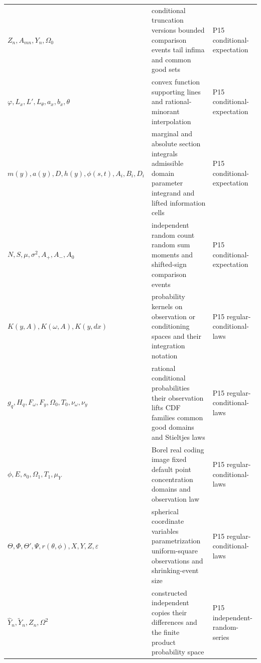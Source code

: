 \begin{longtable}{@{}p{}p{}p{}@{}}
\(Z_n,\allowbreak A_{mn},\allowbreak Y_n,\allowbreak \Omega_0\) & conditional truncation versions bounded comparison events tail infima and common good sets & P15 conditional-\allowbreak{}expectation \\
\(\varphi,\allowbreak L_x,\allowbreak L',\allowbreak L_\theta,\allowbreak a_x,\allowbreak b_x,\allowbreak \theta\) & convex function supporting lines and rational-minorant interpolation & P15 conditional-\allowbreak{}expectation \\
\(m(y),\allowbreak a(y),\allowbreak D,\allowbreak h(y),\allowbreak \phi(s,\allowbreak t),\allowbreak A_i,\allowbreak B_i,\allowbreak D_i\) & marginal and absolute section integrals admissible domain parameter integrand and lifted information cells & P15 conditional-\allowbreak{}expectation \\
\(N,\allowbreak S,\allowbreak \mu,\allowbreak \sigma^2,\allowbreak A_+,\allowbreak A_-,\allowbreak A_0\) & independent random count random sum moments and shifted-sign comparison events & P15 conditional-\allowbreak{}expectation \\
\(K(y,\allowbreak A),\allowbreak K(\omega,\allowbreak A),\allowbreak K(y,\allowbreak dx)\) & probability kernels on observation or conditioning spaces and their integration notation & P15 regular-\allowbreak{}conditional-\allowbreak{}laws \\
\(g_q,\allowbreak H_q,\allowbreak F_\omega,\allowbreak F_y,\allowbreak \Omega_0,\allowbreak T_0,\allowbreak \nu_\omega,\allowbreak \nu_y\) & rational conditional probabilities their observation lifts CDF families common good domains and Stieltjes laws & P15 regular-\allowbreak{}conditional-\allowbreak{}laws \\
\(\phi,\allowbreak E,\allowbreak s_0,\allowbreak \Omega_1,\allowbreak T_1,\allowbreak \mu_Y\) & Borel real coding image fixed default point concentration domains and observation law & P15 regular-\allowbreak{}conditional-\allowbreak{}laws \\
\(\Theta,\allowbreak \Phi,\allowbreak \Theta',\allowbreak \Psi,\allowbreak r(\theta,\allowbreak \phi),\allowbreak X,\allowbreak Y,\allowbreak Z,\allowbreak \varepsilon\) & spherical coordinate variables parametrization uniform-square observations and shrinking-event size & P15 regular-\allowbreak{}conditional-\allowbreak{}laws \\
\(\widehat Y_n,\allowbreak \widetilde Y_n,\allowbreak Z_n,\allowbreak \Omega^2\) & constructed independent copies their differences and the finite product probability space & P15 independent-\allowbreak{}random-\allowbreak{}series \\

\end{longtable}
